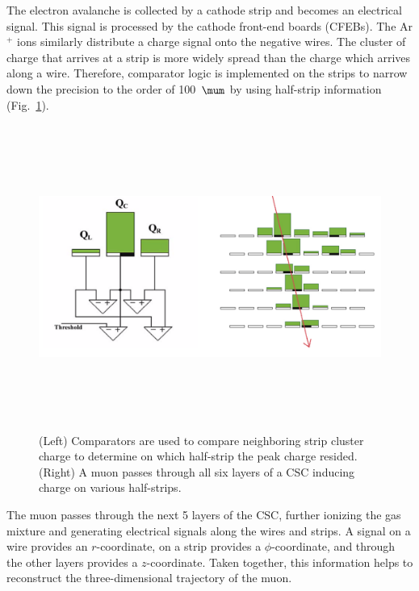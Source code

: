 The electron avalanche is collected by a cathode strip and becomes an electrical signal.
This signal is processed by the cathode front-end boards (CFEBs).
The Ar$^+$ ions similarly distribute a charge signal onto the negative wires.
The cluster of charge that arrives at a strip is more widely spread than the charge which arrives along a wire.
Therefore, comparator logic is implemented on the strips to narrow down the precision to the order of 100~$\mum$ by using half-strip information (Fig.~\ref{fig:comparators}).
\begin{figure}[pbth]
\centering
\includegraphics[width=15cm,height=10cm,keepaspectratio]{figures/cms/muonsys/csc_comparators_and_strips.png}
    \caption{
    (Left) Comparators are used to compare neighboring strip cluster charge to determine on which half-strip the peak charge resided.
    (Right) A muon passes through all six layers of a CSC inducing charge on various half-strips.
    }
    \label{fig:comparators}
\end{figure}

The muon passes through the next 5 layers of the CSC, further ionizing the gas mixture and generating electrical signals along the wires and strips.
A signal on a wire provides an $r$-coordinate, on a strip provides a $\phi$-coordinate, and through the other layers provides a $z$-coordinate.
Taken together, this information helps to reconstruct the three-dimensional trajectory of the muon.

